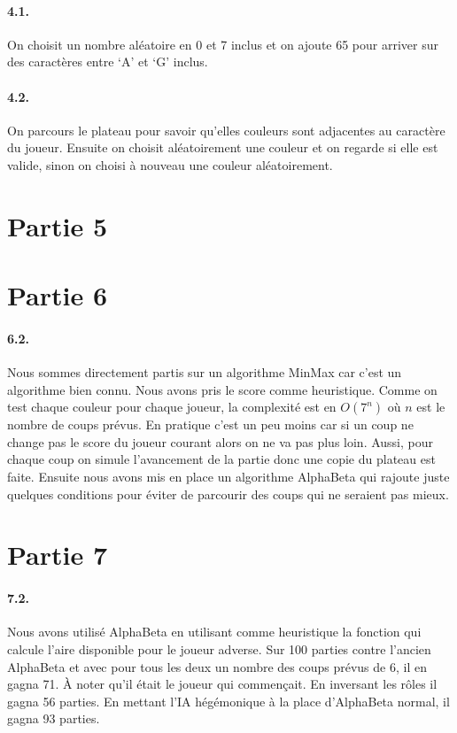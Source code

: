 \documentclass[a4paper]{article}
\begin{document}
    \paragraph{4.1.} On choisit un nombre aléatoire en 0 et 7 inclus et on
    ajoute 65 pour arriver sur des caractères entre `A' et `G' inclus.

    \paragraph{4.2.} On parcours le plateau pour savoir qu'elles couleurs sont
    adjacentes au caractère du joueur. Ensuite on choisit aléatoirement une
    couleur et on regarde si elle est valide, sinon on choisi à nouveau une 
    couleur aléatoirement.

    \section{Partie 5}

    \section{Partie 6}
    \paragraph{6.2.} Nous sommes directement partis sur un algorithme MinMax
    car c'est un algorithme bien connu. Nous avons pris le score comme
    heuristique. Comme on test chaque couleur pour chaque joueur, la complexité
    est en $O(7^n)$ où $n$ est le nombre de coups prévus. En pratique c'est un
    peu moins car si un coup ne change pas le score du joueur courant alors on
    ne va pas plus loin. Aussi, pour chaque coup on simule l'avancement de la 
    partie donc une copie du plateau est faite. Ensuite nous avons mis en place 
    un algorithme AlphaBeta qui rajoute juste quelques conditions pour éviter 
    de parcourir des coups qui ne seraient pas mieux.

    \section{Partie 7}
    \paragraph{7.2.} Nous avons utilisé AlphaBeta en utilisant comme
    heuristique la fonction qui calcule l'aire disponible pour le joueur
    adverse. Sur 100 parties contre l'ancien AlphaBeta et avec pour tous les
    deux un nombre des coups prévus de 6, il en gagna 71. À noter qu'il était
    le joueur qui commençait. En inversant les rôles il gagna 56 parties.
    En mettant l'IA hégémonique à la place d'AlphaBeta normal, il gagna 93
    parties.
\end{document}
